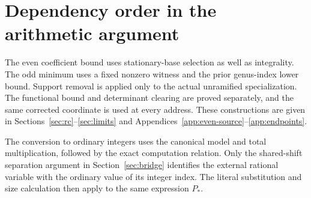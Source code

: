 \documentclass[11pt]{article}
\theoremstyle{definition}
\theoremstyle{remark}
\begin{document}
\appendix
\section{Dependency order in the arithmetic argument}\label{app:obligations}
The even coefficient bound uses stationary-base selection as well as
integrality. The odd minimum uses a fixed nonzero witness and the prior
genus-index lower bound. Support removal is applied only to the actual
unramified specialization. The functional bound and determinant clearing
are proved separately, and the same corrected coordinate is used at every
address. These constructions are given in Sections~\ref{sec:rc}--\ref{sec:limits}
and Appendices~\ref{app:even-source}--\ref{app:endpoints}.

The conversion to ordinary integers uses the canonical model and total
multiplication, followed by the exact computation relation. Only the
shared-shift separation argument in Section~\ref{sec:bridge} identifies
the external rational variable with the ordinary value of its integer
index. The literal substitution and size calculation then apply to the
same expression $P_*$.
\end{document}
